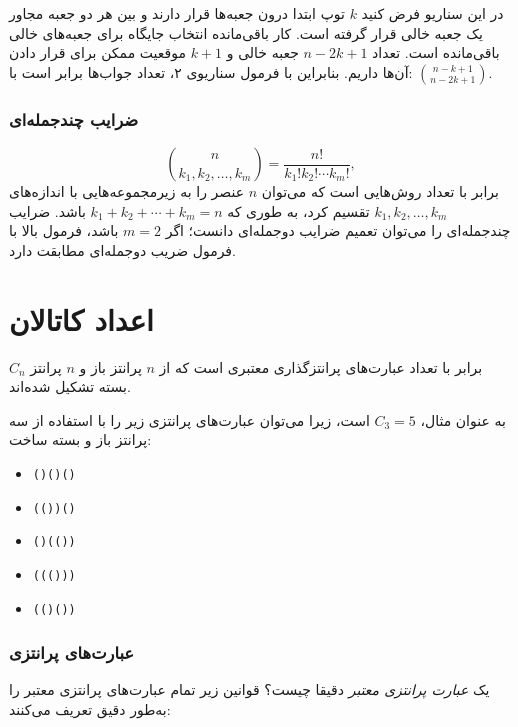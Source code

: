 در این سناریو فرض کنید $k$ توپ ابتدا درون جعبه‌ها قرار دارند و بین هر دو جعبه مجاور یک جعبه خالی قرار گرفته است. کار باقی‌مانده انتخاب جایگاه برای جعبه‌های خالی باقی‌مانده است. تعداد $n-2k+1$ جعبه خالی و $k+1$ موقعیت ممکن برای قرار دادن آن‌ها داریم. بنابراین با فرمول سناریوی ۲، تعداد جواب‌ها برابر است با:
${n-k+1 \choose n-2k+1}$.

\subsubsection{ضرایب چندجمله‌ای}


\[ {n \choose k_1,k_2,\ldots,k_m} = \frac{n!}{k_1! k_2! \cdots k_m!}, \]
برابر با تعداد روش‌هایی است که
می‌توان $n$ عنصر را به زیرمجموعه‌هایی
با اندازه‌های $k_1,k_2,\ldots,k_m$ تقسیم کرد،
به طوری که $k_1+k_2+\cdots+k_m=n$ باشد.
ضرایب چندجمله‌ای را می‌توان تعمیم
ضرایب دوجمله‌ای دانست؛
اگر $m=2$ باشد، فرمول بالا
با فرمول ضریب دوجمله‌ای مطابقت دارد.

\section{اعداد کاتالان}


$C_n$ برابر با
تعداد عبارت‌های پرانتزگذاری معتبری است که از
$n$ پرانتز باز و $n$ پرانتز بسته تشکیل شده‌اند.

به عنوان مثال، $C_3=5$ است، زیرا
می‌توان عبارت‌های پرانتزی زیر را با استفاده از سه
پرانتز باز و بسته ساخت:

\begin{itemize}[noitemsep]
\item \texttt{()()()}
\item \texttt{(())()}
\item \texttt{()(())}
\item \texttt{((()))}
\item \texttt{(()())}
\end{itemize}

\subsubsection{عبارت‌های پرانتزی}


یک \emph{عبارت پرانتزی معتبر} دقیقا چیست؟
قوانین زیر تمام
عبارت‌های پرانتزی معتبر را به‌طور دقیق تعریف می‌کنند:


